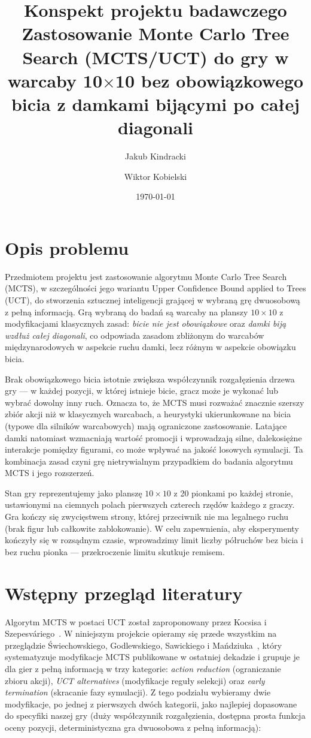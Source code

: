 \documentclass[11pt,a4paper]{article}
\title{Konspekt projektu badawczego \\
\large Zastosowanie Monte Carlo Tree Search (MCTS/UCT) do gry w warcaby 10$\times$10 bez obowiązkowego bicia z damkami bijącymi po całej diagonali}
\author{Jakub Kindracki \and Wiktor Kobielski}
\date{\today}
\begin{document}
\maketitle

\section{Opis problemu}

Przedmiotem projektu jest zastosowanie algorytmu Monte Carlo Tree Search
(MCTS), w szczególności jego wariantu Upper Confidence Bound applied to
Trees (UCT), do stworzenia sztucznej inteligencji grającej w wybraną grę
dwuosobową z pełną informacją. Grą wybraną do badań są warcaby na planszy
$10\times10$ z modyfikacjami klasycznych zasad: \emph{bicie nie jest
obowiązkowe} oraz \emph{damki biją wzdłuż całej diagonali}, co
odpowiada zasadom zbliżonym do warcabów międzynarodowych w aspekcie ruchu
damki, lecz różnym w aspekcie obowiązku bicia.

Brak obowiązkowego bicia istotnie zwiększa współczynnik rozgałęzienia
drzewa gry — w każdej pozycji, w której istnieje bicie, gracz może je
wykonać lub wybrać dowolny inny ruch. Oznacza to, że MCTS musi rozważać
znacznie szerszy zbiór akcji niż w klasycznych warcabach, a heurystyki
ukierunkowane na bicia (typowe dla silników warcabowych) mają
ograniczone zastosowanie. Latające damki natomiast wzmacniają wartość
promocji i wprowadzają silne, dalekosiężne interakcje pomiędzy figurami,
co może wpływać na jakość losowych symulacji. Ta kombinacja zasad czyni
grę nietrywialnym przypadkiem do badania algorytmu MCTS i jego rozszerzeń.

Stan gry reprezentujemy jako planszę $10\times10$ z 20 pionkami po
każdej stronie, ustawionymi na ciemnych polach pierwszych czterech
rzędów każdego z graczy. Gra kończy się zwycięstwem strony, której
przeciwnik nie ma legalnego ruchu (brak figur lub całkowite
zablokowanie). W celu zapewnienia, aby eksperymenty kończyły się w
rozsądnym czasie, wprowadzimy limit liczby półruchów bez bicia i bez
ruchu pionka — przekroczenie limitu skutkuje remisem.

\section{Wstępny przegląd literatury}

Algorytm MCTS w postaci UCT został zaproponowany przez Kocsisa i
Szepesváriego~\cite{kocsis2006uct}. W niniejszym projekcie
opieramy się przede wszystkim na przeglądzie Świechowskiego,
Godlewskiego, Sawickiego i Mańdziuka~\cite{swiechowski2023mcts},
który systematyzuje modyfikacje MCTS publikowane w ostatniej dekadzie
i grupuje je dla gier z pełną informacją w trzy kategorie:
\emph{action reduction} (ograniczanie zbioru akcji), \emph{UCT
alternatives} (modyfikacje reguły selekcji) oraz \emph{early
termination} (skracanie fazy symulacji). Z tego podziału wybieramy
dwie modyfikacje, po jednej z pierwszych dwóch kategorii, jako
najlepiej dopasowane do specyfiki naszej gry (duży współczynnik
rozgałęzienia, dostępna prosta funkcja oceny pozycji,
deterministyczna gra dwuosobowa z pełną informacją):
\end{document}
